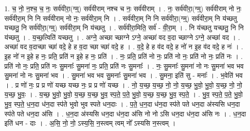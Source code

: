 \documentclass[17pt]{extarticle}
\begin{document}
1. च॒ नो॒ न॒श्च॒ च॒ नः॒ सर्व॑वीरा॒(ग्म्॒) सर्व॑वीराम् नश्च च नः॒ सर्व॑वीराम् । . नः॒ सर्व॑वीरा॒(ग्म्॒) सर्व॑वीराम् नो नः॒ सर्व॑वीरा॒म् नि नि सर्व॑वीराम् नो नः॒ सर्व॑वीरा॒म् नि । . सर्व॑वीरा॒म् नि नि सर्व॑वीरा॒(ग्म्॒) सर्व॑वीरा॒म् नि य॑च्छतु यच्छतु॒ नि सर्व॑वीरा॒(ग्म्॒) सर्व॑वीरा॒म् नि य॑च्छतु । . सर्व॑वीरा॒मिति॒ सर्व॑ - वी॒रा॒म् । . नि य॑च्छतु यच्छतु॒ नि नि य॑च्छतु । . य॒च्छ॒त्विति॑ यच्छतु । . अग्ने॒ अच्छा च्छाग्ने ऽग्ने॒ अच्छा॑ वद व॒दा च्छाग्ने ऽग्ने॒ अच्छा॑ वद । . अच्छा॑ वद व॒दाच्छा च्छा॑ वदे॒ हे ह व॒दा च्छा च्छा॑ वदे॒ ह । . व॒दे॒ हे ह व॑द वदे॒ ह नो॑ न इ॒ह व॑द वदे॒ ह नः॑ । . इ॒ह नो॑ न इ॒हे ह नः॒ प्रति॒ प्रति॑ न इ॒हे ह नः॒ प्रति॑ । . नः॒ प्रति॒ प्रति॑ नो नः॒ प्रति॑ नो नः॒ प्रति॑ नो नः॒ प्रति॑ नः । . प्रति॑ नो नः॒ प्रति॒ प्रति॑ नः सु॒मनाः᳚ सु॒मना॑ नः॒ प्रति॒ प्रति॑ नः सु॒मनाः᳚ । . नः॒ सु॒मनाः᳚ सु॒मना॑ नो नः सु॒मना॑ भव भव सु॒मना॑ नो नः सु॒मना॑ भव । . सु॒मना॑ भव भव सु॒मनाः᳚ सु॒मना॑ भव । . सु॒मना॒ इति॑ सु - मनाः᳚ । . भ॒वेति॑ भव । . प्र णो॑ नः॒ प्र प्र णो॑ यच्छ यच्छ नः॒ प्र प्र णो॑ यच्छ । . नो॒ य॒च्छ॒ य॒च्छ॒ नो॒ नो॒ य॒च्छ॒ भु॒वो॒ भु॒वो॒ य॒च्छ॒ नो॒ नो॒ य॒च्छ॒ भु॒वः॒ । . य॒च्छ॒ भु॒वो॒ भु॒वो॒ य॒च्छ॒ य॒च्छ॒ भु॒व॒ स्प॒ते॒ प॒ते॒ भु॒वो॒ य॒च्छ॒ य॒च्छ॒ भु॒व॒ स्प॒ते॒ । . भु॒व॒ स्प॒ते॒ प॒ते॒ भु॒वो॒ भु॒व॒ स्प॒ते॒ ध॒न॒दा ध॑न॒दा स्प॑ते भुवो भुव स्पते धन॒दाः । . प॒ते॒ ध॒न॒दा ध॑न॒दा स्प॑ते पते धन॒दा अ॑स्यसि धन॒दा स्प॑ते पते धन॒दा अ॑सि । . ध॒न॒दा अ॑स्यसि धन॒दा ध॑न॒दा अ॑सि नो नो ऽसि धन॒दा ध॑न॒दा अ॑सि नः । . ध॒न॒दा इति॑ धन - दाः । . अ॒सि॒ नो॒ नो॒ ऽस्य॒सि॒ न॒स्त्वम् त्वम् नो᳚ ऽस्यसि न॒स्त्वम् । \newline
\end{document}

